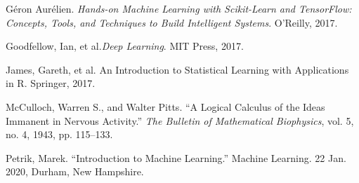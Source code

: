 \documentclass[12pt,letterpaper]{article}
\begin{document}
\begin{thebibliography}{9}


Géron Aurélien. \textit{Hands-on Machine Learning with Scikit-Learn and TensorFlow: Concepts, Tools, and Techniques to Build Intelligent Systems}. O'Reilly, 2017.

Goodfellow, Ian, et al.\textit{Deep Learning}. MIT Press, 2017.

James, Gareth, et al. {An Introduction to Statistical Learning with Applications in R}. Springer, 2017.

McCulloch, Warren S., and Walter Pitts. “A Logical Calculus of the Ideas Immanent in Nervous Activity.” \textit{The Bulletin of Mathematical Biophysics}, vol. 5, no. 4, 1943, pp. 115–133.

Petrik, Marek. “Introduction to Machine Learning.” Machine Learning. 22 Jan. 2020, Durham, New Hampshire.

\end{thebibliography}

\end{document}
